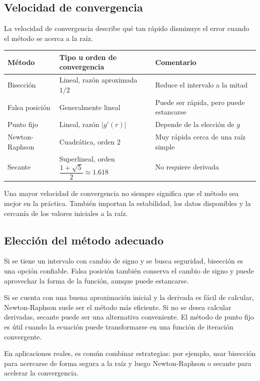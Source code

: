 \documentclass[a4,11pt]{aleph-notas}
\begin{document}
\subsection{Velocidad de convergencia}

La velocidad de convergencia describe qué tan rápido disminuye el error cuando el método se acerca a la raíz.

\begin{center}
\small
\begin{tabular}{p{}p{}p{}}
\toprule
Método & Tipo u orden de convergencia & Comentario \\
\midrule
Bisección & Lineal, razón aproximada $1/2$ & Reduce el intervalo a la mitad \\
Falsa posición & Generalmente lineal & Puede ser rápida, pero puede estancarse \\
Punto fijo & Lineal, razón $|g'(r)|$ & Depende de la elección de $g$ \\
Newton-Raphson & Cuadrática, orden $2$ & Muy rápida cerca de una raíz simple \\
Secante & Superlineal, orden $\dfrac{1+\sqrt{5}}{2}\approx 1.618$ & No requiere derivada \\
\bottomrule
\end{tabular}
\end{center}

\begin{advertencia}
    Una mayor velocidad de convergencia no siempre significa que el método sea mejor en la práctica. También importan la estabilidad, los datos disponibles y la cercanía de los valores iniciales a la raíz.
\end{advertencia}

\subsection{Elección del método adecuado}

Si se tiene un intervalo con cambio de signo y se busca seguridad, bisección es una opción confiable. Falsa posición también conserva el cambio de signo y puede aprovechar la forma de la función, aunque puede estancarse.

Si se cuenta con una buena aproximación inicial y la derivada es fácil de calcular, Newton-Raphson suele ser el método más eficiente. Si no se desea calcular derivadas, secante puede ser una alternativa conveniente. El método de punto fijo es útil cuando la ecuación puede transformarse en una función de iteración convergente.

\begin{advertencia}
    En aplicaciones reales, es común combinar estrategias: por ejemplo, usar bisección para acercarse de forma segura a la raíz y luego Newton-Raphson o secante para acelerar la convergencia.
\end{advertencia}
\end{document}
